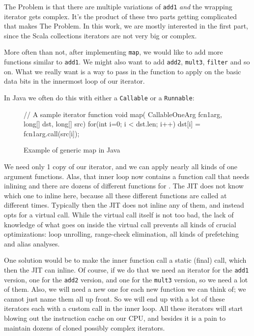 The Problem is that there are multiple variations of \texttt{add1} \emph{and}
the wrapping iterator gets complex.  It's the product of these two parts getting
complicated that makes The Problem. In this work, we are mostly interested in
the first part, since the Scala collections iterators are not very big or
complex.

More often than not, after implementing \texttt{map}, we would like to add more
functions similar to \texttt{add1}. We might also want to add \texttt{add2}, \texttt{mult3},
\texttt{filter} and so on. What we really want is a way to pass in the function to
apply on the basic data bits in the innermost loop of our iterator.

In Java we often do this with either a \texttt{Callable} or a \texttt{Runnable}:\\

\begin{figure}
\begin{javaCode}
// A sample iterator function
void map( CallableOneArg fcn1arg, long[] dst, long[] src) {
  for(int i=0; i < dst.len; i++)
    dst[i] = fcn1arg.call(src[i]);
}
\end{javaCode}
\caption[Example of generic map in Java]{Example of generic map in Java}
\label{java_generic_map}
\end{figure}
  
We need only 1 copy of our iterator, and we can apply nearly all kinds of one
argument functions. Alas, that inner loop now contains a function call that
needs inlining and there are dozens of different functions for .
The JIT does not know which one to inline here, because all these different
functions are called at different times.  Typically then the JIT does not inline
any of them, and instead opts for a virtual call.  While the virtual call
itself is not too bad, the lack of knowledge of what goes on inside the virtual
call prevents all kinds of crucial optimizations: loop unrolling, range-check
elimination, all kinds of prefetching and alias analyses.

One solution  would be to make the inner function call a static (final)
call, which then the JIT can inline. Of course, if we do that we need an
iterator for the \texttt{add1} version, one for the \texttt{add2} version, and one for the
\texttt{mult3} version, so we need a lot of them. Also, we will need a new one for
each new function we can think of; we cannot just name them all up front.  So we
will end up with a lot of these iterators each with a custom call in the inner
loop. All these iterators will start blowing out the instruction cache on our
CPU, and besides it is a pain to maintain dozens of cloned possibly complex
iterators.


